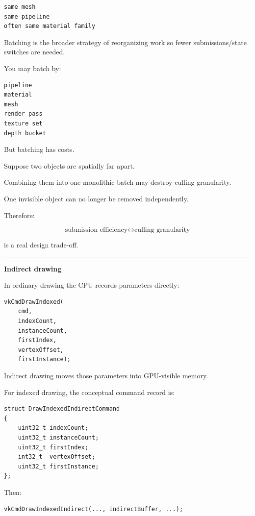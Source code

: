 \begin{verbatim}
same mesh
same pipeline
often same material family
\end{verbatim}

Batching is the broader strategy of reorganizing work so fewer submissions/state switches are needed.

You may batch by:

\begin{verbatim}
pipeline
material
mesh
render pass
texture set
depth bucket
\end{verbatim}

But batching has costs.

Suppose two objects are spatially far apart.

Combining them into one monolithic batch may destroy culling granularity.

One invisible object can no longer be removed independently.

Therefore:

\[
\boxed{
\text{submission efficiency}
\leftrightarrow
\text{culling granularity}
}
\]

is a real design trade-off.

\begin{center}\rule{0.5\linewidth}{0.5pt}\end{center}

\textbf{Indirect drawing}

In ordinary drawing the CPU records parameters directly:

\begin{verbatim}
vkCmdDrawIndexed(
    cmd,
    indexCount,
    instanceCount,
    firstIndex,
    vertexOffset,
    firstInstance);
\end{verbatim}

Indirect drawing moves those parameters into GPU-visible memory.

For indexed drawing, the conceptual command record is:

\begin{verbatim}
struct DrawIndexedIndirectCommand
{
    uint32_t indexCount;
    uint32_t instanceCount;
    uint32_t firstIndex;
    int32_t  vertexOffset;
    uint32_t firstInstance;
};
\end{verbatim}

Then:

\begin{verbatim}
vkCmdDrawIndexedIndirect(..., indirectBuffer, ...);
\end{verbatim}

